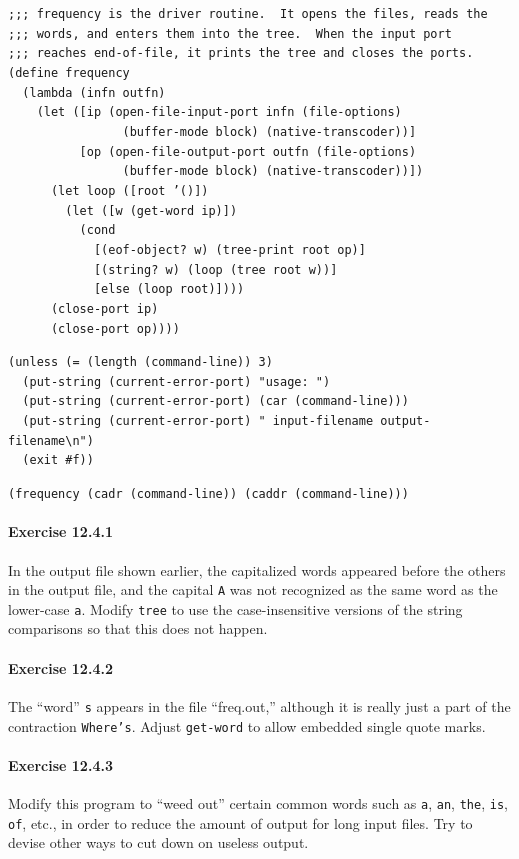 \begin{alltt}
;;; frequency is the driver routine.  It opens the files, reads the
;;; words, and enters them into the tree.  When the input port
;;; reaches end-of-file, it prints the tree and closes the ports.
(define frequency
  (lambda (infn outfn)
    (let ([ip (open-file-input-port infn (file-options)
                (buffer-mode block) (native-transcoder))]
          [op (open-file-output-port outfn (file-options)
                (buffer-mode block) (native-transcoder))])
      (let loop ([root '()])
        (let ([w (get-word ip)])
          (cond
            [(eof-object? w) (tree-print root op)]
            [(string? w) (loop (tree root w))]
            [else (loop root)])))
      (close-port ip)
      (close-port op))))

(unless (= (length (command-line)) 3)
  (put-string (current-error-port) "usage: ")
  (put-string (current-error-port) (car (command-line)))
  (put-string (current-error-port) " input-filename output-filename\textbackslash{}n")
  (exit \#{}f))

(frequency (cadr (command-line)) (caddr (command-line)))
\end{alltt}

\paragraph{Exercise \label{examples_g170}12.4.1}


\label{examples_s25}In the output file shown earlier, the capitalized words appeared before
the others in the output file, and the capital \texttt{A} was not recognized
as the same word as the lower-case \texttt{a}.
Modify \texttt{tree} to use the case-insensitive versions of the string
comparisons so that this does not happen.


\paragraph{Exercise \label{examples_g171}12.4.2}


\label{examples_s26}The ``word'' \texttt{s} appears in the file ``freq.out,'' although it
is really just a part of the contraction \texttt{Where's}.
Adjust \texttt{get-word} to allow embedded single quote marks.


\paragraph{Exercise \label{examples_g172}12.4.3}


\label{examples_s27}Modify this program to ``weed out'' certain common words such as \texttt{a},
\texttt{an}, \texttt{the}, \texttt{is}, \texttt{of}, etc., in order to reduce the
amount of output for long input files.
Try to devise other ways to cut down on useless output.


